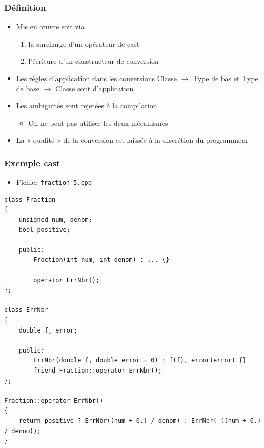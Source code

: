 \begin{frame}
\frametitle{Définition}
\begin{itemize}[<+->]
\item Mis en œuvre soit via
	\begin{enumerate}
	\item la surcharge d'un opérateur de cast
	\item l'écriture d'un constructeur de conversion
	\end{enumerate}
\item Les règles d'application dans les conversions Classe $\rightarrow$ Type de bas et Type de base $\rightarrow$ Classe sont d'application
\item Les ambiguïtés sont rejetées à la compilation
	\begin{itemize}
	\item On ne peut pas utiliser les deux mécanismes
	\end{itemize}
\item La « qualité » de la conversion est laissée à la discrétion du programmeur
\end{itemize}
\end{frame}

\begin{frame}[containsverbatim]
\frametitle{Exemple cast}
\begin{itemize}
\item Fichier \texttt{fraction-5.cpp}
\end{itemize}
\begin{lstlisting}
class Fraction
{
	unsigned num, denom;
	bool positive;

	public:
		Fraction(int num, int denom) : ... {}

		operator ErrNbr();
};

class ErrNbr
{
	double f, error;	

	public:
		ErrNbr(double f, double error = 0) : f(f), error(error) {}	
		friend Fraction::operator ErrNbr();
};

Fraction::operator ErrNbr()
{
	return positive ? ErrNbr((num + 0.) / denom) : ErrNbr(-((num + 0.) / denom));
}
\end{lstlisting}
\end{frame}

